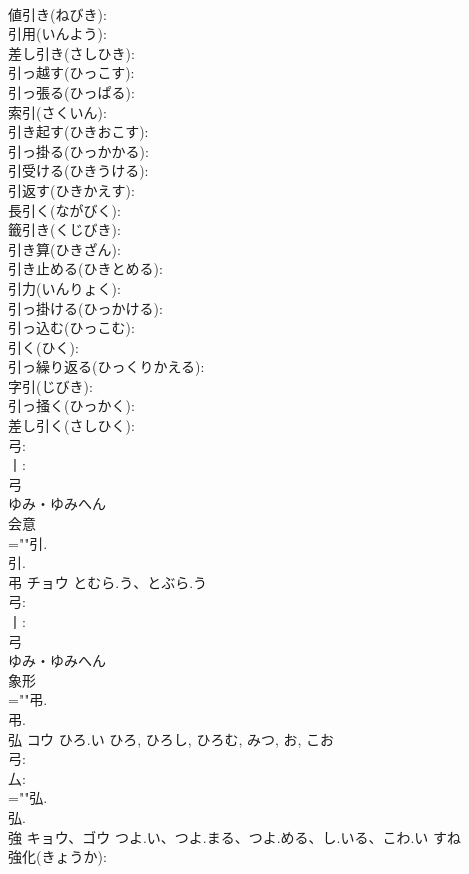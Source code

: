 \documentclass[8pt]{extreport}
\begin{document}
\begin{CJK}{UTF8}{min}
\\	値引き(ねびき): 
\\	引用(いんよう): 
\\	差し引き(さしひき): 
\\	引っ越す(ひっこす): 
\\	引っ張る(ひっぱる): 
\\	索引(さくいん): 
\\	引き起す(ひきおこす): 
\\	引っ掛る(ひっかかる): 
\\	引受ける(ひきうける): 
\\	引返す(ひきかえす): 
\\	長引く(ながびく): 
\\	籤引き(くじびき): 
\\	引き算(ひきざん): 
\\	引き止める(ひきとめる): 
\\	引力(いんりょく): 
\\	引っ掛ける(ひっかける): 
\\	引っ込む(ひっこむ): 
\\	引く(ひく): 
\\	引っ繰り返る(ひっくりかえる): 
\\	字引(じびき): 
\\	引っ掻く(ひっかく): 
\\	差し引く(さしひく): 
\\	弓: 
\\	丨: 
\\	弓	
\\	ゆみ・ゆみへん	
\\	会意 
\\	=""引.
\\	引.
\\	弔	チョウ	とむら.う、とぶら.う		
\\	弓: 
\\	丨: 
\\	弓	
\\	ゆみ・ゆみへん	
\\	象形 
\\	=""弔.
\\	弔.
\\	弘	コウ	ひろ.い	ひろ, ひろし, ひろむ, みつ, お, こお	
\\	弓: 
\\	厶: 
\\	=""弘.
\\	弘.
\\	強	キョウ、ゴウ	つよ.い、つよ.まる、つよ.める、し.いる、こわ.い	すね	
\\	強化(きょうか): 

\end{CJK}
\end{document}
